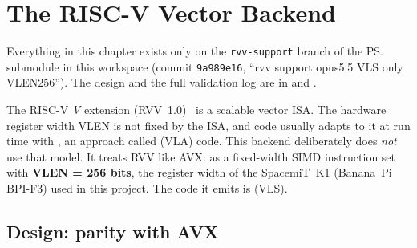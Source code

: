 \chapter{The RISC-V Vector Backend}\label{ch:rvv-backend}

\begin{forkonly}
  Everything in this chapter exists only on the \texttt{rvv-support} branch of the
  \ps{} submodule in this workspace (commit \texttt{9a989e16}, ``rvv support opus5.5 VLS
  only VLEN256''). The design and the full validation log are in
   and
  .
\end{forkonly}

The RISC-V \emph{V} extension (RVV~1.0)~\cite{rvv-spec} is a scalable vector ISA. The
hardware register width VLEN is not fixed by the ISA, and code usually adapts to it at
run time with , an approach called  (VLA)
code. This backend deliberately does \emph{not} use that model. It treats RVV like AVX:
as a fixed-width SIMD instruction set with \textbf{VLEN = 256 bits}, the register width
of the SpacemiT~K1 (Banana~Pi BPI-F3) used in this project. The code it emits is
 (VLS).

\section{Design: parity with AVX}


